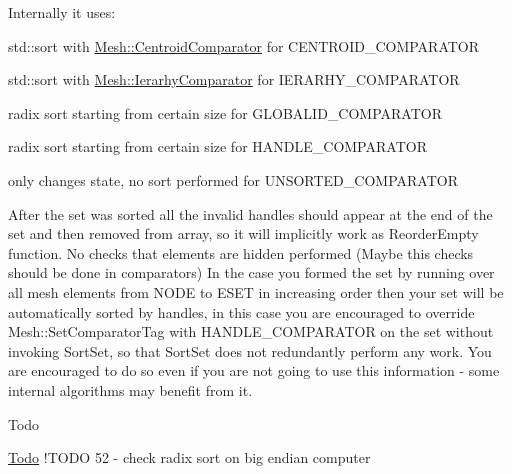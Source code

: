 Internally it uses\-:
\begin{DoxyItemize}
\item std\-::sort with \hyperlink{classINMOST_1_1Mesh_1_1CentroidComparator}{Mesh\-::\-Centroid\-Comparator} for C\-E\-N\-T\-R\-O\-I\-D\-\_\-\-C\-O\-M\-P\-A\-R\-A\-T\-O\-R
\item std\-::sort with \hyperlink{classINMOST_1_1Mesh_1_1IerarhyComparator}{Mesh\-::\-Ierarhy\-Comparator} for I\-E\-R\-A\-R\-H\-Y\-\_\-\-C\-O\-M\-P\-A\-R\-A\-T\-O\-R
\item radix sort starting from certain size for G\-L\-O\-B\-A\-L\-I\-D\-\_\-\-C\-O\-M\-P\-A\-R\-A\-T\-O\-R
\item radix sort starting from certain size for H\-A\-N\-D\-L\-E\-\_\-\-C\-O\-M\-P\-A\-R\-A\-T\-O\-R
\item only changes state, no sort performed for U\-N\-S\-O\-R\-T\-E\-D\-\_\-\-C\-O\-M\-P\-A\-R\-A\-T\-O\-R
\end{DoxyItemize}

After the set was sorted all the invalid handles should appear at the end of the set and then removed from array, so it will implicitly work as Reorder\-Empty function. No checks that elements are hidden performed (Maybe this checks should be done in comparators) In the case you formed the set by running over all mesh elements from N\-O\-D\-E to E\-S\-E\-T in increasing order then your set will be automatically sorted by handles, in this case you are encouraged to override Mesh\-::\-Set\-Comparator\-Tag with H\-A\-N\-D\-L\-E\-\_\-\-C\-O\-M\-P\-A\-R\-A\-T\-O\-R on the set without invoking Sort\-Set, so that Sort\-Set does not redundantly perform any work. You are encouraged to do so even if you are not going to use this information -\/ some internal algorithms may benefit from it.

\begin{DoxyRefDesc}{Todo}
\item[\hyperlink{todo__todo000003}{Todo}]!\-T\-O\-D\-O 52 -\/ check radix sort on big endian computer \end{DoxyRefDesc}

